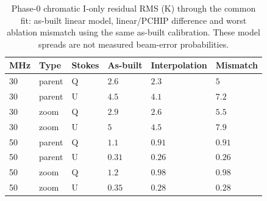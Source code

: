 \begin{table}[htbp]
\centering\small
\caption{Phase-0 chromatic I-only residual RMS (K) through the common fit: as-built linear model, linear/PCHIP difference and worst ablation mismatch using the same as-built calibration. These model spreads are not measured beam-error probabilities.}
\label{tab:leakage}
\begin{tabular}{llllll}
\toprule
MHz & Type & Stokes & As-built & Interpolation & Mismatch\\
\midrule
30 & parent & Q & $2.6$ & $2.3$ & $5$\\
30 & parent & U & $4.5$ & $4.1$ & $7.2$\\
30 & zoom & Q & $2.9$ & $2.6$ & $5.5$\\
30 & zoom & U & $5$ & $4.5$ & $7.9$\\
50 & parent & Q & $1.1$ & $0.91$ & $0.91$\\
50 & parent & U & $0.31$ & $0.26$ & $0.26$\\
50 & zoom & Q & $1.2$ & $0.98$ & $0.98$\\
50 & zoom & U & $0.35$ & $0.28$ & $0.28$\\
\bottomrule
\end{tabular}
\end{table}
